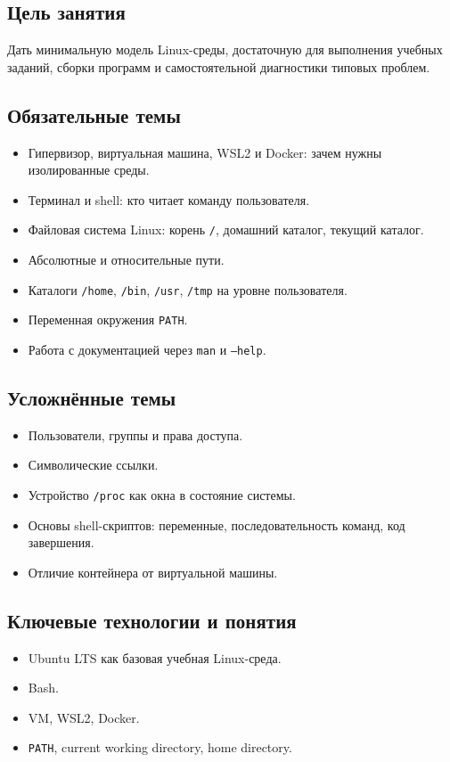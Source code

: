 \subsection*{Цель занятия}
Дать минимальную модель Linux-среды, достаточную для выполнения учебных заданий, сборки программ и самостоятельной диагностики типовых проблем.

\subsection*{Обязательные темы}
\begin{itemize}
    \item Гипервизор, виртуальная машина, WSL2 и Docker: зачем нужны изолированные среды.
    \item Терминал и shell: кто читает команду пользователя.
    \item Файловая система Linux: корень \texttt{/}, домашний каталог, текущий каталог.
    \item Абсолютные и относительные пути.
    \item Каталоги \texttt{/home}, \texttt{/bin}, \texttt{/usr}, \texttt{/tmp} на уровне пользователя.
    \item Переменная окружения \texttt{PATH}.
    \item Работа с документацией через \texttt{man} и \texttt{--help}.
\end{itemize}

\subsection*{Усложнённые темы}
\begin{itemize}
    \item Пользователи, группы и права доступа.
    \item Символические ссылки.
    \item Устройство \texttt{/proc} как окна в состояние системы.
    \item Основы shell-скриптов: переменные, последовательность команд, код завершения.
    \item Отличие контейнера от виртуальной машины.
\end{itemize}

\subsection*{Ключевые технологии и понятия}
\begin{itemize}
    \item Ubuntu LTS как базовая учебная Linux-среда.
    \item Bash.
    \item VM, WSL2, Docker.
    \item \texttt{PATH}, current working directory, home directory.
\end{itemize}

